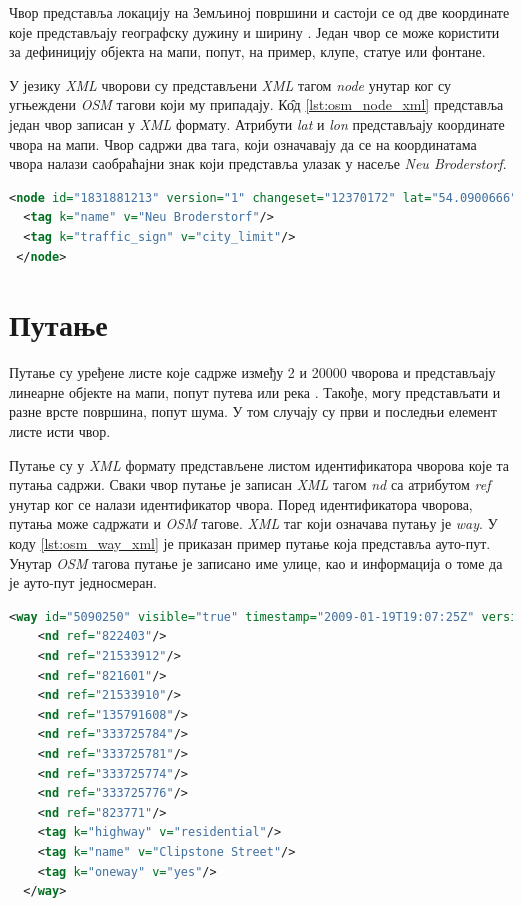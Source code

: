 \documentclass[12pt,oneside]{memoir}
\begin{document}
Чвор представља локацију на Земљиној површини и састоји се од две координате које представљају географску дужину и ширину \cite{osm_wiki}. Један чвор се може користити за дефиницију објекта на мапи, попут, на пример, клупе, статуе или фонтане.

У језику \textit{XML} чворови су представљени \textit{XML} тагом \textit{node} унутар ког су угњеждени \textit{OSM} тагови који му припадају. К\^{о}д \ref{lst:osm_node_xml} представља један чвор записан у \textit{XML} формату. Атрибути \textit{lat} и \textit{lon} представљају координате чвора на мапи. Чвор садржи два тага, који означавају да се на координатама чвора налази саобраћајни знак који представља улазак у насеље \textit{Neu Broderstorf}.

\begin{lstlisting}[language=XML, caption={\textit{XML} запис \textit{OSM} чвора који представља саобраћајни знак}, label={lst:osm_node_xml}]
<node id="1831881213" version="1" changeset="12370172" lat="54.0900666" lon="12.2539381" user="lafkor" uid="75625" visible="true" timestamp="2012-07-20T09:43:19Z">
  <tag k="name" v="Neu Broderstorf"/>
  <tag k="traffic_sign" v="city_limit"/>
 </node>
\end{lstlisting}

\section{Путање}
\label{sec:osm_ways}

Путање су уређене листе које садрже између 2 и 20000 чворова и представљају линеарне објекте на мапи, попут путева или река \cite{osm_wiki}. Такође, могу представљати и разне врсте површина, попут шума. У том случају су први и последњи елемент листе исти чвор. 

Путање су у \textit{XML} формату представљене листом идентификатора чворова које та путања садржи. Сваки чвор путање је записан \textit{XML} тагом \textit{nd} са атрибутом \textit{ref} унутар ког се налази идентификатор чвора. Поред идентификатора чворова, путања може садржати и \textit{OSM} тагове. \textit{XML} таг који означава путању је \textit{way}. У коду \ref{lst:osm_way_xml} је приказан пример путање која представља ауто-пут. Унутар \textit{OSM} тагова путање је записано име улице, као и информација о томе да је ауто-пут једносмеран.

\begin{lstlisting}[language=XML, caption={\textit{XML} запис \textit{OSM} путањe која представља ауто-пут}, label={lst:osm_way_xml}]
<way id="5090250" visible="true" timestamp="2009-01-19T19:07:25Z" version="8" changeset="816806" user="Blumpsy" uid="64226">
    <nd ref="822403"/>
    <nd ref="21533912"/>
    <nd ref="821601"/>
    <nd ref="21533910"/>
    <nd ref="135791608"/>
    <nd ref="333725784"/>
    <nd ref="333725781"/>
    <nd ref="333725774"/>
    <nd ref="333725776"/>
    <nd ref="823771"/>
    <tag k="highway" v="residential"/>
    <tag k="name" v="Clipstone Street"/>
    <tag k="oneway" v="yes"/>
  </way>
\end{lstlisting}
\end{document}
